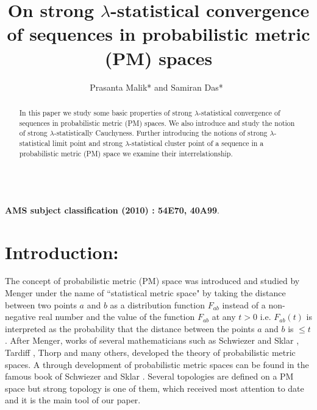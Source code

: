 \documentclass[reqno,b5paper]{amsart}
\theoremstyle{plain}
\theoremstyle{definition}
\begin{document}
\setcounter{page}{1}
\title{On strong $\lambda$-statistical convergence of sequences in probabilistic metric (PM) spaces }
\author[P. Malik, S. Das]{Prasanta Malik* and Samiran Das*\ }
\newcommand{\acr}{\newline\indent}
\maketitle
\address{{*\,} Department of Mathematics, The University of Burdwan, Golapbag, Burdwan-713104,
West Bengal, India.
                Email: pmjupm@yahoo.co.in, das91samiran@gmail.com \acr
           }

\maketitle
\begin{abstract}
In this paper we study some basic properties of strong
$\lambda$-statistical convergence of sequences in probabilistic
metric (PM) spaces. We also introduce and study the notion of
strong $\lambda$-statistically Cauchyness. Further introducing the
notions of strong $\lambda$-statistical limit point and strong
$\lambda$-statistical cluster point of a sequence in a
probabilistic metric (PM) space we examine their
interrelationship.

\end{abstract}

\author{}
 \\


\textbf {AMS subject classification (2010) : 54E70, 40A99}.  \\
\section{\textbf{Introduction:}}

The concept of probabilistic metric (PM) space was introduced and
studied by Menger \cite{Me} under the name of ``statistical metric
space" by taking the distance between two points $a$ and $b$ as a
distribution function $F_{ab}$ instead of a non-negative real
number and the value of the function $F_{ab}$ at any $t> 0 $ i.e.
$F_{ab}(t) $ is interpreted as the probability that the distance
between the points $a$ and $b$ is $\leq t$. After Menger, works of
several mathematicians such as Schwiezer and Sklar \cite{Sh, Sh1,
Sh2, Sh3}, Tardiff \cite{Tar}, Thorp \cite{Th} and many others,
developed the theory of probabilistic metric spaces. A through
development of probabilistic metric spaces can be found in the
famous book of Schwiezer and Sklar \cite{Sh4}. Several topologies
are defined on a PM space but strong topology is one of them,
which received most attention to date  and it is the main tool of
our paper.
\end{document}

